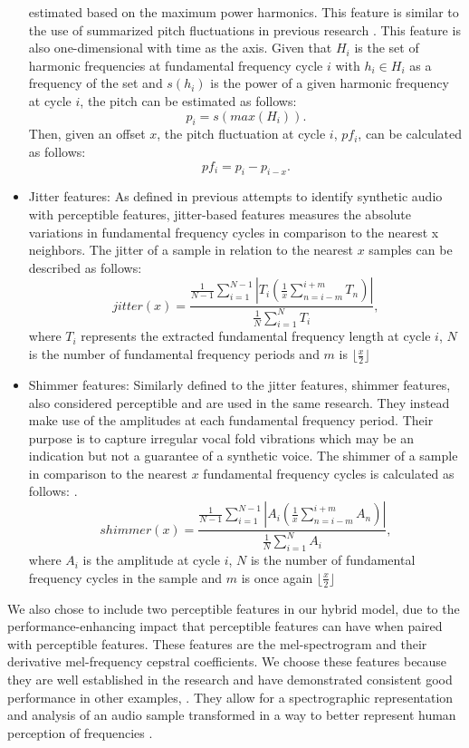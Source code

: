 \documentclass{article}
\begin{document}
\begin{itemize}
					estimated based on the maximum power harmonics. This feature is similar to the
					use of summarized pitch fluctuations in previous research
					\cite{khanjani_learning_2023}. This feature is also one-dimensional with time
					as the axis. Given that \(H_{i}\) is the set of harmonic frequencies at
					fundamental frequency cycle \(i\) with \(h_{i} \in H_{i}\) as a frequency of
					the set and \(s(h_{i})\) is the power of a given harmonic frequency at cycle
					\(i\), the pitch can be estimated as follows:
					\[p_{i} = s(max(H_{i})).\]
					Then, given an offset \(x\), the pitch fluctuation at cycle \(i\), \(pf_{i}\),
					can be calculated as follows:
					\[pf_{i} = p_{i}-p_{i-x}.\]
				\item
					Jitter features: As defined in previous attempts to identify synthetic audio
					\cite{chaiwongyen_deepfake-speech_2023} with perceptible features,
					jitter-based features measures the absolute variations in fundamental
					frequency cycles in comparison to the nearest x neighbors. The jitter of a
					sample in relation to the nearest \(x\) samples can be described as follows:
					\[ jitter(x) = \frac{ \frac{1}{N-1}\sum_{i=1}^{N-1}|T_{i}
						(\frac{1}{x}\sum_{n=i-m}^{i+m}T_{n})|}
					{\frac{1}{N}\sum_{i=1}^{N}T_{i}}, \]
					where \(T_{i}\) represents the extracted fundamental frequency length at cycle
					\(i\), \(N\) is the number of fundamental frequency periods and \(m\) is
					\(\lfloor \frac{x}{2} \rfloor\)
				\item
					Shimmer features: Similarly defined to the jitter features, shimmer features,
					also considered perceptible and are used in the same research. They instead
					make use of the amplitudes at each fundamental frequency period. Their purpose
					is to capture irregular vocal fold vibrations which may be an indication but
					not a guarantee of a synthetic voice. The shimmer of a sample in comparison to
					the nearest \(x\) fundamental frequency cycles is calculated as follows:
					\cite{chaiwongyen_deepfake-speech_2023}.
					\[ shimmer(x) = \frac{ \frac{1}{N-1}\sum_{i=1}^{N-1}|A_{i}
						(\frac{1}{x}\sum_{n=i-m}^{i+m}A_{n})|}
					{\frac{1}{N}\sum_{i=1}^{N}A_{i}}, \]
					where \(A_{i}\) is the amplitude at cycle \(i\), \(N\) is the number of
					fundamental frequency cycles in the sample and \(m\) is once again 
					\(\lfloor \frac{x}{2} \rfloor\)
			\end{itemize}
			We also chose to include two perceptible features in our hybrid model, due to the
			performance-enhancing impact that perceptible features can have
			\cite{chaiwongyen_deepfake-speech_2023} when paired with perceptible features. These
			features are the mel-spectrogram and their derivative mel-frequency cepstral
			coefficients. We choose these features because they are well established in the
			research and have demonstrated consistent good performance in other examples,
			\cite{qais_deepfake_2022,anagha_audio_2023,fathan_mel-spectrogram_2022,
			altalahin_unmasking_2023,hamza_deepfake_2022,yan_initial_2022}. They allow for a
			spectrographic representation and analysis of an audio sample transformed in a way to
			better represent human perception of frequencies \cite{qais_deepfake_2022}.
\end{document}
